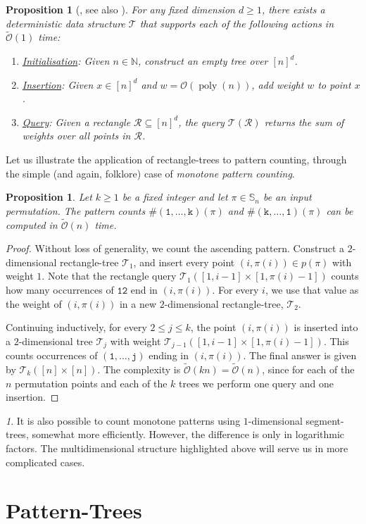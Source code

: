 \documentclass{article}
\newtheorem{proposition}[theorem]{Proposition}
\newcommand{\Sn}{\mathbb{S}_n}
\newcommand{\pc}[2]{{\# \mathtt{ #1 } \left( #2 \right)}}
\DeclareMathOperator{\poly}{poly}
\theoremstyle{remark}
\newtheorem{rem}[theorem]{\protect\remarkname}
\providecommand{\remarkname}{Remark}
\newcommand{\Otilde}[1]{\widetilde{\mathcal{O}}\left( #1 \right)}
\theoremstyle{plain}
\begin{document}
\begin{proposition}[\cite{chazelle1988functional, jaja2005space}, see also \cite{dudek2020counting}]
    \label{prop:rect_trees}
    For any fixed dimension $d\ge 1$, there exists a deterministic data structure $\mathcal{T}$ that supports each of the following actions in $\Otilde{1}$ time:
    \begin{enumerate}
        \item  \underline{Initialisation}: Given $n \in \mathbb{N}$, construct an empty tree over $[n]^d$.
        \item \underline{Insertion}: Given $x\in [n]^d$ and $w = \mathcal{O}\left(\poly(n)\right)$, add weight $w$ to point $x$.
        \item \underline{Query}: Given a rectangle $\mathcal{R} \subseteq [n]^d$, the query $\mathcal{T}(\mathcal{R})$ returns the sum of weights over all points in $\mathcal{R}$.
    \end{enumerate}
\end{proposition}
Let us illustrate the application of rectangle-trees to pattern counting, through the simple (and again, folklore) case of \textit{monotone pattern counting}.
\begin{proposition}
    \label{prop:count-123k}
    Let $k\geq 1$ be a fixed integer and let $\pi\in\Sn$ be an input permutation.
    The pattern counts $\pc{(1,\ldots,k)}{\pi}$ and $\pc{(k,\ldots,1)}{\pi}$ can be computed in $\Otilde{n}$ time.
\end{proposition}
\begin{proof}
    Without loss of generality, we count the ascending pattern.
    Construct a $2$-dimensional rectangle-tree $\mathcal{T}_1$, and insert every point $(i,\pi(i))\in p(\pi)$ with weight $1$.
    Note that the rectangle query $\mathcal{T}_1([1,i-1]\times [1,\pi(i)-1])$ counts how many occurrences of $\mathtt{12}$ end in $(i,\pi(i))$.
    For every $i$, we use that value as the weight of $(i,\pi(i))$ in a new $2$-dimensional rectangle-tree, $\mathcal{T}_2$.
    
    Continuing inductively, for every $2\leq j \leq k$,
    the point $(i,\pi(i))$ is inserted into a $2$-dimensional tree $\mathcal{T}_j$ with weight $\mathcal{T}_{j-1}([1,i-1]\times [1,\pi(i)-1])$. This counts occurrences of  $\mathtt{(1,\ldots,j)}$ ending in $(i,\pi(i))$.
    The final answer is given by $\mathcal{T}_k([n]\times [n])$.
    The complexity is $\Otilde{kn}=\Otilde{n}$,
    since for each of the $n$ permutation points and each of the $k$ trees we perform one query and one insertion.
\end{proof}
\begin{rem}
    It is also possible to count monotone patterns using $1$-dimensional segment-trees, somewhat more efficiently.
    However, the difference is only in logarithmic factors.
    The multidimensional structure highlighted above will serve us in more complicated cases.
\end{rem} \section{Pattern-Trees}
\label{sect:pattern_trees}
\end{document}
